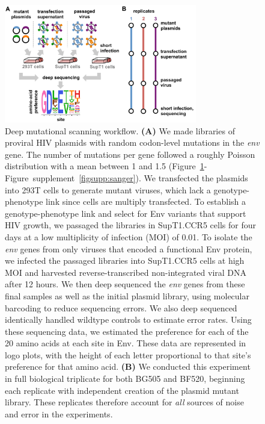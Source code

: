 \documentclass[9pt]{elife}
\begin{document}
\begin{figure}
\centerline{\includegraphics[width=0.75\textwidth]{figures/dms_schematic/dms_schematic.pdf}}
\caption{\label{fig:dms_schematic}
Deep mutational scanning workflow.
{\bf (A)} We made libraries of proviral HIV plasmids with random codon-level mutations in the \textit{env} gene.
The number of mutations per gene followed a roughly Poisson distribution with a mean between 1 and 1.5 (Figure~\ref{fig:dms_schematic}-Figure~supplement~\ref{figsupp:sanger}).
We transfected the plasmids into 293T cells to generate mutant viruses, which lack a genotype-phenotype link since cells are multiply transfected.
To establish a genotype-phenotype link and select for Env variants that support HIV growth, we passaged the libraries in SupT1.CCR5 cells for four days at a low multiplicity of infection (MOI) of 0.01.
To isolate the \textit{env} genes from only viruses that encoded a functional Env protein, we infected the passaged libraries into SupT1.CCR5 cells at high MOI and harvested reverse-transcribed non-integrated viral DNA after 12 hours.
We then deep sequenced the \textit{env} genes from these final samples as well as the initial plasmid library, using molecular barcoding to reduce sequencing errors.
We also deep sequenced identically handled wildtype controls to estimate error rates.
Using these sequencing data, we estimated the preference for each of the 20 amino acids at each site in Env.
These data are represented in logo plots, with the height of each letter proportional to that site's preference for that amino acid.
{\bf (B)} We conducted this experiment in full biological triplicate for both BG505 and BF520, beginning each replicate with independent creation of the plasmid mutant library.
These replicates therefore account for \emph{all} sources of noise and error in the experiments.
}
\end{figure}
\end{document}
